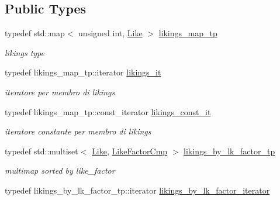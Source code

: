 \subsection*{Public Types}
\begin{DoxyCompactItemize}
\item 
\hypertarget{structSpeciesInfo_aa70735bd441c2465b36bef55cfabb1bf}{
typedef std::map$<$ unsigned int, \hyperlink{structLike}{Like} $>$ \hyperlink{structSpeciesInfo_aa70735bd441c2465b36bef55cfabb1bf}{likings\_\-map\_\-tp}}
\label{structSpeciesInfo_aa70735bd441c2465b36bef55cfabb1bf}

\begin{DoxyCompactList}\small\item\em likings type \end{DoxyCompactList}\item 
\hypertarget{structSpeciesInfo_a06dc895ad5da1d736e971e0690194c5f}{
typedef likings\_\-map\_\-tp::iterator \hyperlink{structSpeciesInfo_a06dc895ad5da1d736e971e0690194c5f}{likings\_\-it}}
\label{structSpeciesInfo_a06dc895ad5da1d736e971e0690194c5f}

\begin{DoxyCompactList}\small\item\em iteratore per membro di likings \end{DoxyCompactList}\item 
\hypertarget{structSpeciesInfo_acd0e4c451993ca95135fcdc8840c344b}{
typedef likings\_\-map\_\-tp::const\_\-iterator \hyperlink{structSpeciesInfo_acd0e4c451993ca95135fcdc8840c344b}{likings\_\-const\_\-it}}
\label{structSpeciesInfo_acd0e4c451993ca95135fcdc8840c344b}

\begin{DoxyCompactList}\small\item\em iteratore constante per membro di likings \end{DoxyCompactList}\item 
typedef std::multiset$<$ \hyperlink{structLike}{Like}, \hyperlink{structLikeFactorCmp}{LikeFactorCmp} $>$ \hyperlink{structSpeciesInfo_aab6fabec09f9eb5a26e680d1d6f9d037}{likings\_\-by\_\-lk\_\-factor\_\-tp}
\begin{DoxyCompactList}\small\item\em multimap sorted by like\_\-factor \end{DoxyCompactList}\item 
\hypertarget{structSpeciesInfo_ac9d1365506aed6cd1daf2ba982a80473}{
typedef likings\_\-by\_\-lk\_\-factor\_\-tp::iterator \hyperlink{structSpeciesInfo_ac9d1365506aed6cd1daf2ba982a80473}{likings\_\-by\_\-lk\_\-factor\_\-iterator}}
\label{structSpeciesInfo_ac9d1365506aed6cd1daf2ba982a80473}


\end{DoxyCompactItemize}
